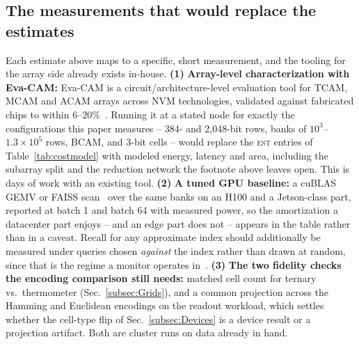 \subsection{The measurements that would replace the estimates}
\label{subsec:NextMeasurements}
Each estimate above maps to a specific, short measurement, and the
tooling for the array side already exists in-house.
{\bf (1)} \textbf{Array-level characterization with Eva-CAM:} Eva-CAM
is a circuit/architecture-level evaluation tool for TCAM, MCAM and
ACAM arrays across NVM technologies, validated against fabricated
chips to within 6--20\%~\cite{liu2022evacam}. Running it at a stated
node for exactly the configurations this paper measures -- 384- and
2{,}048-bit rows, banks of $10^{3}$--$1.3\!\times\!10^{5}$ rows, BCAM,
\tcam and 3-bit \mcam cells -- would replace the \textsc{est} entries
of Table~\ref{tab:costmodel} with modeled energy, latency and area,
including the subarray split and the reduction network the footnote
above leaves open. This is days of work with an existing tool.
{\bf (2)} \textbf{A tuned GPU baseline:} a cuBLAS GEMV or FAISS
scan~\cite{faisscuvs2025} over the same banks on an H100 and a
Jetson-class part, reported at batch 1 and batch 64 with measured
power, so the amortization a datacenter part enjoys -- and an edge
part does not -- appears in the table rather than in a caveat. Recall
for any approximate index should additionally be measured under
queries chosen \emph{against} the index rather than drawn at random,
since that is the regime a monitor operates
in~\cite{andoni2026robustann}.
{\bf (3)} \textbf{The two fidelity checks the encoding comparison
still needs:} matched cell count for ternary vs.\ thermometer
(Sec.~\ref{subsec:Grids}), and a common projection across the Hamming
and Euclidean encodings on the readout workload, which settles whether
the cell-type flip of Sec.~\ref{subsec:Devices} is a device result or
a projection artifact. Both are cluster runs on data already in hand.
